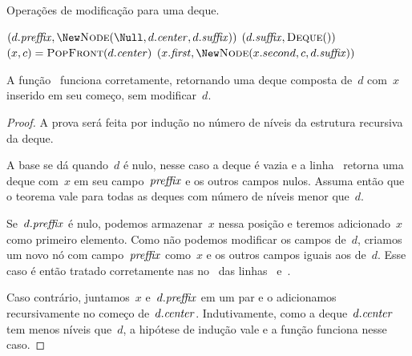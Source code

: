 \documentclass[../../main.tex]{subfiles}
\begin{document}
\begin{algorithm}
\caption{Operações de modificação para uma deque.} \label{lst:deque_mod}
\begin{algorithmic}[1]

        \State \Return \New {} \label{line:dm:puf1}
     \label{line:dm:puf2}
        \State \Return \New {}\label{line:dm:puf2_1}
    \Else
        \State \Return \New {} \label{line:dm:puf3}
	\EndIf
\EndFunction

     \label{line:dm:pof1}
        \State \Return $(d.\V{preffix}, \New \Call{Node}{\Null, d.\V{center}, d.\V{suffix}})$ \label{line:dm:pof1_2}
        \State \Return $(d.\V{suffix}, \Call{Deque}{\null})$ \label{line:dm:pof2}
    \Else
        \State $(x, c) = \Call{PopFront}{d.\V{center}}$
        \State \Return $(x.\V{first}, \New \Call{Node}{x.second, c, d.\V{suffix}})$ \label{line:dm:pof3}
	\EndIf
\EndFunction

\end{algorithmic}
\end{algorithm}

\begin{proposition}
A função~ funciona corretamente, retornando uma deque composta de~$d$ com~$x$ inserido em seu começo, sem modificar~$d$.
\end{proposition}

\begin{proof}
A prova será feita por indução no número de níveis da estrutura recursiva da deque.

A base se dá quando~$d$ é nulo, nesse caso a deque é vazia e a linha~ retorna uma deque com~$x$ em seu campo~$\mathit{preffix}$ e os outros campos nulos. Assuma então que o teorema vale para todas as deques com número de níveis menor que~$d$.

Se~$d.\mathit{preffix}$ é nulo, podemos armazenar~$x$ nessa posição e teremos adicionado~$x$ como primeiro elemento. Como não podemos modificar os campos de~$d$, criamos um novo nó com campo~$\mathit{preffix}$ como~$x$ e os outros campos iguais aos de~$d$. Esse caso é então tratado corretamente nas no~ das linhas~ e~.

Caso contrário, juntamos~$x$ e~$d.\mathit{preffix}$ em um par e o adicionamos recursivamente no começo de~$d.\mathit{center}$. Indutivamente, como a deque~$d.\mathit{center}$ tem menos níveis que~$d$, a hipótese de indução vale e a função funciona nesse caso.
\end{proof}
\end{document}
